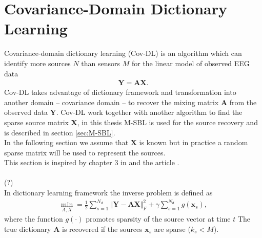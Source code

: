 \section{Covariance-Domain Dictionary Learning}\label{sec:Cov-DL}
Covariance-domain dictionary learning (Cov-DL) is an algorithm which can identify more sources $N$ than sensors $M$ for the linear model of observed EEG data
\begin{align*}
\mathbf{Y} = \mathbf{AX}.
\end{align*}
Cov-DL takes advantage of dictionary framework and transformation into another domain -- covariance domain -- to recover the mixing matrix $\mathbf{A}$ from the observed data $\mathbf{Y}$. Cov-DL work together with another algorithm to find the sparse source matrix $\mathbf{X}$, in this thesis M-SBL is used for the source recovery and is described in section \ref{sec:M-SBL}. 
\\
In the following section we assume that $\mathbf{X}$ is known but in practice a random sparse matrix will be used to represent the sources. 
\\
This section is inspired by chapter 3 in \cite{phd2015} and the article \cite{Cov-DL}.
\\ \\
(?)\\
In dictionary learning framework the inverse problem is defined as
\begin{align*}
\min_{A,X} = \frac{1}{2} \sum_{s=1}^{N_d} \Vert \mathbf{Y} - \mathbf{AX} \Vert_F^2 + \gamma \sum_{s=1}^{N_d} g(\mathbf{x}_s),
\end{align*}
where the function $g(\cdot)$ promotes sparsity of the source vector at time $t$ 
The true dictionary $\mathbf{A}$ is recovered if the sources $\mathbf{x}_s$ are sparse ($k_s < M$).


